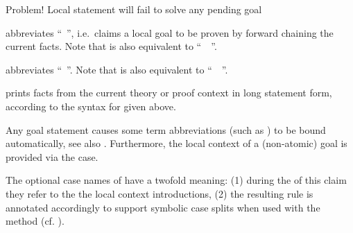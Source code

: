 \begin{isabellebody}
\begin{isamarkuptext}
\begin{descr}
  \begin{ttbox}
  Problem! Local statement will fail to solve any pending goal
  \end{ttbox}
  
  \item [\mbox{\isa{\isacommand{hence}}}] abbreviates ``\mbox{}~\mbox{}'', i.e.\ claims a local goal to be proven by forward
  chaining the current facts.  Note that \mbox{} is also
  equivalent to ``\mbox{}~~\mbox{}''.
  
  \item [\mbox{\isa{\isacommand{thus}}}] abbreviates ``\mbox{}~\mbox{}''.  Note that \mbox{} is also equivalent to
  ``\mbox{}~~\mbox{}''.
  
  \item [\mbox{\isa{\isacommand{print{\isacharunderscore}statement}}}~\isa{a}] prints facts from the
  current theory or proof context in long statement form, according to
  the syntax for \mbox{} given above.

  \end{descr}

  Any goal statement causes some term abbreviations (such as
  \mbox{}) to be bound automatically, see also
  .  Furthermore, the local context of a
  (non-atomic) goal is provided via the \mbox{} case.

  The optional case names of \mbox{} have a twofold
  meaning: (1) during the of this claim they refer to the the local
  context introductions, (2) the resulting rule is annotated
  accordingly to support symbolic case splits when used with the
  \mbox{} method (cf.  ).

  \medskip


\end{isamarkuptext}
\end{isabellebody}

